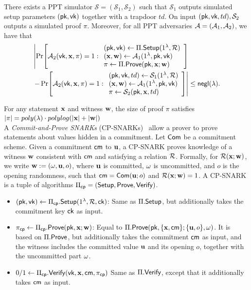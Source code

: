 \documentclass[sigconf,anonymous,review,balance=false]{acmart}
\begin{document}
There exists a PPT simulator $\mathcal{S} = (\mathcal{S}_1, \mathcal{S}_2)$ such that $\mathcal{S}_1$ outputs simulated setup parameters $({\sf pk}, {\sf vk})$ together with a trapdoor $td$. On input $({\sf pk}, {\sf vk}, td), \mathcal{S}_2$ outputs a simulated proof $\pi$. Moreover, for all PPT adversaries $\mathcal{A} = ({\mathcal{A}}_1, {\mathcal{A}}_2)$, we have that
\begin{align*}
    &\left|
    \Pr\!\left[
      {\mathcal{A}}_2({\sf vk}, {\mathbf{x}}, \pi) = 1 :
      \begin{array}{l}
        ({\sf pk},{\sf vk})\leftarrow \Pi.{\sf Setup}(1^\lambda, {\mathcal{R}}) \\
        ({\mathbf{x}}, {\mathbf{w}}) \gets {\mathcal{A}}_1(1^\lambda, {\sf pk}, {\sf vk}) \\
        \pi\leftarrow \Pi.{\sf Prove}({\sf pk}, {\mathbf{x}}; {\mathbf{w}})
      \end{array}
    \right]
    \right. \nonumber\\
    &\left.
    -
    \Pr\!\left[
      {\mathcal{A}}_2({\sf vk}, {\mathbf{x}}, \pi) = 1 :
      \begin{array}{l}
        ({\sf pk},{\sf vk},td)\leftarrow \mathcal{S}_1(1^\lambda, {\mathcal{R}}) \\
        ({\mathbf{x}}, {\mathbf{w}}) \gets {\mathcal{A}}_1(1^\lambda, {\sf pk}, {\sf vk}) \\
        \pi\leftarrow \mathcal{S}_2({\sf pk}, {\mathbf{x}}, td)
      \end{array}
    \right]
    \right|
    \le {\sf negl}(\lambda).
\end{align*}

 For any statement ${\mathbf{x}}$ and witness ${\mathbf{w}}$, the size of proof $\pi$ satisfies $|\pi| = poly(\lambda)\cdot polylog(|{\mathbf{x}}| + |{\mathbf{w}}|)$ \\


A \textit{Commit-and-Prove SNARKs} (CP-SNARKs)~\cite{Legosnark, Lunar} allow a prover to prove statements about values hidden in a commitment. Let ${\sf Com}$ be a commitment scheme. Given a commitment ${\sf cm}$ to ${\mathbf{u}}$, a CP-SNARK proves knowledge of a witness ${\mathbf{w}}$ consistent with ${\sf cm}$ and satisfying a relation ${\mathcal{R}}$. Formally, for ${\mathcal{R}}({\mathbf{x}};{\mathbf{w}})$, we write ${\mathbf{w}} := ({\mathbf{\omega}}, {\mathbf{u}}, o)$, where ${\mathbf{u}}$ is committed, ${\mathbf{\omega}}$ is uncommitted, and $o$ is the opening randomness, such that ${\sf cm}={\sf Com}({\mathbf{u}}; o)$ and ${\mathcal{R}}({\mathbf{x}}; {\mathbf{w}})=1$. A CP-SNARK is a tuple of algorithms $\Pi_{{\sf cp}}=({\sf Setup},{\sf Prove},{\sf Verify})$.
\begin{itemize}
    \item $({\sf pk}, {\sf vk}) \gets \Pi_{\sf cp}.{\sf Setup}(1^\lambda, {\mathcal{R}}, {\sf ck})$: Same as $\Pi.{\sf Setup}$, but additionally takes the commitment key ${\sf ck}$ as input.
    \item $\pi_{{\sf cp}} \gets \Pi_{\sf cp}.{\sf Prove}({\sf pk}, {\mathbf{x}}; {\mathbf{w}})$:
    Equal to $\Pi.{\sf Prove}({\sf pk}, \{{\mathbf{x}},{\sf cm}\};\{{\mathbf{u}},o\}, {\mathbf{\omega}})$.
    It is based on $\Pi.{\sf Prove}$, but additionally takes the commitment ${\sf cm}$ as input, and the witness includes the committed value ${\mathbf{u}}$ and its opening $o$, together with the uncommitted part ${\mathbf{\omega}}$.
    \item $0/1 \gets \Pi_{\sf cp}.{\sf Verify}({\sf vk}, {\mathbf{x}}, {\sf cm}, \pi_{\sf cp})$ Same as $\Pi.{\sf Verify}$, except that it additionally takes ${\sf cm}$ as input.
\end{itemize}
\end{document}
